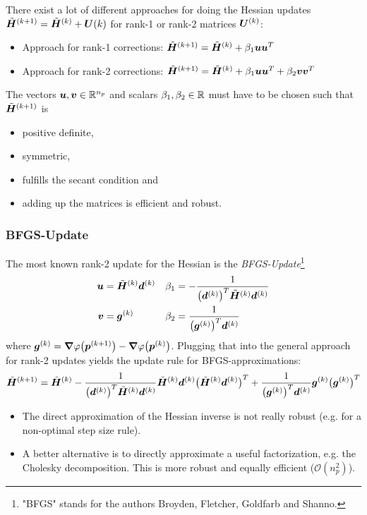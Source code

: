 			There exist a lot of different approaches for doing the Hessian updates \( \tilde{\bm{H}}^{(k + 1)} = \tilde{\bm{H}}^{(k)} + \bm{U}{(k)} \) for rank-1 or rank-2 matrices \(\bm{U}^{(k)}\):
			\begin{itemize}
				\item Approach for rank-1 corrections: \tabto{6cm} \( \tilde{\bm{H}}^{(k + 1)} = \tilde{\bm{H}}^{(k)} + \beta_1 \bm{u} \bm{u}^T \)
				\item Approach for rank-2 corrections: \tabto{6cm} \( \tilde{\bm{H}}^{(k + 1)} = \tilde{\bm{H}}^{(k)} + \beta_1 \bm{u} \bm{u}^T + \beta_2 \bm{v} \bm{v}^T \)
			\end{itemize}
			The vectors \( \bm{u}, \bm{v} \in \mathbb{R}^{n_p} \) and scalars \( \beta_1, \beta_2 \in \mathbb{R} \) must have to be chosen such that \( \tilde{\bm{H}}^{(k + 1)} \) is
			\begin{itemize}
				\item positive definite,
				\item symmetric,
				\item fulfills the secant condition and
				\item adding up the matrices is efficient and robust.
			\end{itemize}

			\subsubsection{BFGS-Update}
				The most known rank-2 update for the Hessian is the \emph{BFGS-Update}\footnote{"BFGS" stands for the authors Broyden, Fletcher, Goldfarb and Shanno.}
				\begin{align*}
					\bm{u} & = \tilde{\bm{H}}^{(k)} \bm{d}^{(k)} & \beta_1 & = -\frac{1}{\big(\bm{d}^{(k)}\big)^T \tilde{\bm{H}}^{(k)} \bm{d}^{(k)}} \\
					\bm{v} & = \bm{g}^{(k)}                       & \beta_2 & = \frac{1}{\big(\bm{g}^{(k)}\big)^T \bm{d}^{(k)}}
				\end{align*}
				where \( \bm{g}^{(k)} = \grad{\varphi}\big(\bm{p}^{(k + 1)}\big) - \grad{\varphi}\big(\bm{p}^{(k)}\big) \). Plugging that into the general approach for rank-2 updates yields the update rule for BFGS-approximations:
				\begin{align*}
					\tilde{\bm{H}}^{(k + 1)} = \tilde{\bm{H}}^{(k)}
					- \frac{1}{\big(\bm{d}^{(k)}\big)^T \tilde{\bm{H}}^{(k)} \bm{d}^{(k)}} \tilde{\bm{H}}^{(k)} \bm{d}^{(k)} \big(\tilde{\bm{H}}^{(k)} \bm{d}^{(k)}\big)^T
					+ \frac{1}{\big(\bm{g}^{(k)}\big)^T \bm{d}^{(k)}} \bm{g}^{(k)} \big(\bm{g}^{(k)}\big)^T
				\end{align*}
				\begin{itemize}
					\item The direct approximation of the Hessian inverse is not really robust (e.g. for a non-optimal step size rule).
					\item A better alternative is to directly approximate a useful factorization, e.g. the Cholesky decomposition. This is more robust and equally efficient (\( \mathcal{O}(n_p^2) \)).
				\end{itemize}

